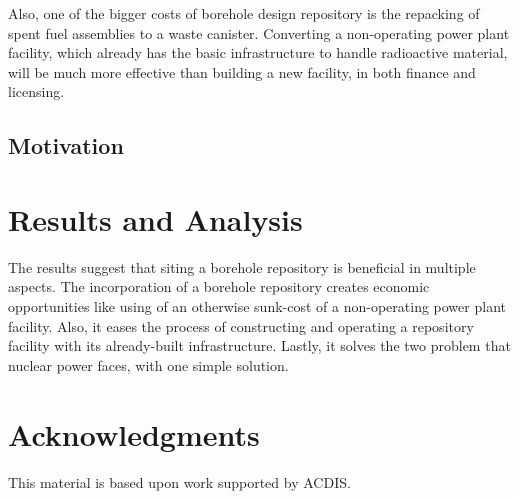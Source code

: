 \documentclass{anstrans}
\begin{document}
Also, one of the bigger costs of borehole design repository is the repacking of 
spent fuel assemblies to a waste canister. Converting a non-operating power 
plant facility, which already has the basic infrastructure to handle 
radioactive material, will be much more effective than building a new facility, 
in both finance and licensing. 

\subsection{Motivation}



\section{Results and Analysis}
The results suggest that siting a borehole repository is beneficial in multiple 
aspects. The incorporation of a borehole repository creates economic 
opportunities like using of an otherwise sunk-cost of a non-operating power 
plant facility. Also, it eases the process of constructing and operating a 
repository facility with its already-built infrastructure. Lastly, it solves 
the two problem that nuclear power faces, with one simple solution.

\section{Acknowledgments}

This material is based upon work supported by ACDIS.



\end{document}
